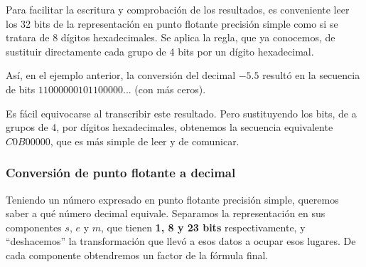 \documentclass[spanish,A4,]{article}
\begin{document}
Para facilitar la escritura y comprobación de los resultados, es
conveniente leer los 32 bits de la representación en punto flotante
precisión simple como si se tratara de 8 dígitos hexadecimales. Se
aplica la regla, que ya conocemos, de sustituir directamente cada grupo
de 4 bits por un dígito hexadecimal.

Así, en el ejemplo anterior, la conversión del decimal $-5.5$ resultó en
la secuencia de bits $11000000101100000...$ (con más ceros).

Es fácil equivocarse al transcribir este resultado. Pero sustituyendo
los bits, de a grupos de 4, por dígitos hexadecimales, obtenemos la
secuencia equivalente $C0B00000$, que es más simple de leer y de
comunicar.

\subsubsection{Conversión de punto flotante a
decimal}\label{conversiuxf3n-de-punto-flotante-a-decimal}

Teniendo un número expresado en punto flotante precisión simple,
queremos saber a qué número decimal equivale. Separamos la
representación en sus componentes $s$, $e$ y $m$, que tienen \textbf{1,
8 y 23 bits} respectivamente, y ``deshacemos'' la transformación que
llevó a esos datos a ocupar esos lugares. De cada componente obtendremos
un factor de la fórmula final.
\end{document}
